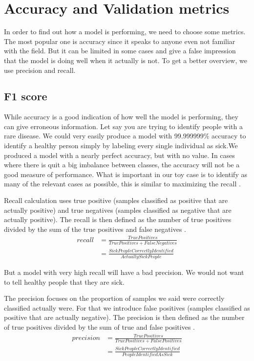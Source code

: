 \section{Accuracy and Validation metrics}
In order to find out how a model is performing, we need to choose some metrics. The most popular one is accuracy since it speaks to anyone even not familiar with the field. But it can be limited in some cases and give a false impression that the model is doing well when it actually is not. To get a better overview, we use precision and recall. 

\subsection{F1 score}
While accuracy is a good indication of how well the model is performing, they can give erroneous information. Let say you are trying to identify people with a rare disease. We could very easily produce a model with 99.999999\% accuracy to identify a healthy person simply by labeling every single individual as sick.We produced a model with a nearly perfect accuracy, but with no value. In cases where there is quit a big imbalance between classes, the accuracy will not be a good measure of performance.
What is important in our toy case is to identify as many of the relevant cases as possible, this is similar to maximizing the recall \cite{multimetrics}. 

Recall calculation uses true positive (samples classified as positive that are actually positive) and true negatives (samples classified as negative that are actually positive). The recall is then defined as the number of true positives divided by the sum of the true positives and false negatives \cite{metrics}. 
\begin{subequations}
\begin{align}
recall & = \frac{True Positives}{True Positives + False Negatives} \\
 & = \frac{Sick People Correctly Identified}{Actually Sick People}
\end{align}
\end{subequations}

But a model with very high recall will have a bad precision. We would not want to tell healthy people that they are sick. 

The precision focuses on the proportion of samples we said were correctly classified actually were. For that we introduce false positives (samples classified as positive that are actually negative). The precision is then defined as the number of true positives divided by the sum of true and false positives \cite{metrics}.
\begin{subequations}
\begin{align}
precision & = \frac{True Positives}{True Positives + False Positives} \\
 & = \frac{Sick People Correctly Identified}{People Identified As Sick}
\end{align}
\end{subequations}


